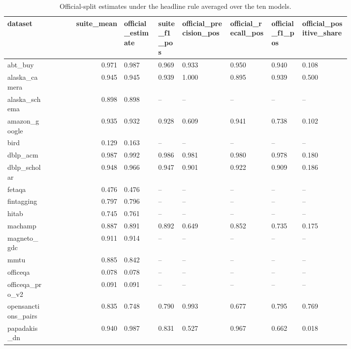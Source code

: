 \begin{table}[htbp]
\centering\tiny
\caption{Official-split estimates under the headline rule averaged over the ten models.}
\label{tab:official_split_by_dataset}
\setlength{\tabcolsep}{3pt}
\begin{tabular}{p{0.121\linewidth}rp{0.108\linewidth}p{0.076\linewidth}p{0.140\linewidth}p{0.121\linewidth}p{0.095\linewidth}p{0.146\linewidth}}
\toprule
dataset & suite\_\allowbreak{}mean & official\_\allowbreak{}estimate & suite\_\allowbreak{}f1\_\allowbreak{}pos & official\_\allowbreak{}precision\_\allowbreak{}pos & official\_\allowbreak{}recall\_\allowbreak{}pos & official\_\allowbreak{}f1\_\allowbreak{}pos & official\_\allowbreak{}positive\_\allowbreak{}share \\
\midrule
abt\_\allowbreak{}buy & 0.971 & 0.987 & 0.969 & 0.933 & 0.950 & 0.940 & 0.108 \\
alaska\_\allowbreak{}camera & 0.945 & 0.945 & 0.939 & 1.000 & 0.895 & 0.939 & 0.500 \\
alaska\_\allowbreak{}schema & 0.898 & 0.898 & -- & -- & -- & -- & -- \\
amazon\_\allowbreak{}google & 0.935 & 0.932 & 0.928 & 0.609 & 0.941 & 0.738 & 0.102 \\
bird & 0.129 & 0.163 & -- & -- & -- & -- & -- \\
dblp\_\allowbreak{}acm & 0.987 & 0.992 & 0.986 & 0.981 & 0.980 & 0.978 & 0.180 \\
dblp\_\allowbreak{}scholar & 0.948 & 0.966 & 0.947 & 0.901 & 0.922 & 0.909 & 0.186 \\
fetaqa & 0.476 & 0.476 & -- & -- & -- & -- & -- \\
fintagging & 0.797 & 0.796 & -- & -- & -- & -- & -- \\
hitab & 0.745 & 0.761 & -- & -- & -- & -- & -- \\
machamp & 0.887 & 0.891 & 0.892 & 0.649 & 0.852 & 0.735 & 0.175 \\
magneto\_\allowbreak{}gdc & 0.911 & 0.914 & -- & -- & -- & -- & -- \\
mmtu & 0.885 & 0.842 & -- & -- & -- & -- & -- \\
officeqa & 0.078 & 0.078 & -- & -- & -- & -- & -- \\
officeqa\_\allowbreak{}pro\_\allowbreak{}v2 & 0.091 & 0.091 & -- & -- & -- & -- & -- \\
opensanctions\_\allowbreak{}pairs & 0.835 & 0.748 & 0.790 & 0.993 & 0.677 & 0.795 & 0.769 \\
papadakis\_\allowbreak{}dn & 0.940 & 0.987 & 0.831 & 0.527 & 0.967 & 0.662 & 0.018 \\

\end{tabular}
\end{table}
